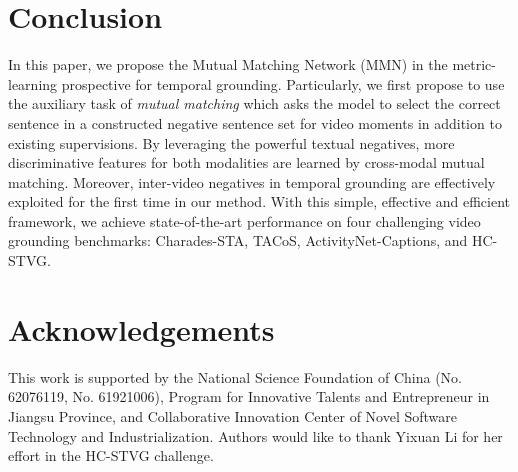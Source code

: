\documentclass[letterpaper]{article} \usepackage{aaai22}  \usepackage{times}  \usepackage{helvet}  \usepackage{courier}  \usepackage[hyphens]{url}  \usepackage{graphicx} \urlstyle{rm} \def\UrlFont{\rm}  \usepackage{natbib}  \usepackage{caption} \DeclareCaptionStyle{ruled}{labelfont=normalfont,labelsep=colon,strut=off} \frenchspacing  \setlength{\pdfpagewidth}{8.5in}  \setlength{\pdfpageheight}{11in}  \usepackage{algorithm}
\begin{document}
\section{Conclusion}
In this paper, we propose the Mutual Matching Network (MMN) in the metric-learning prospective for temporal grounding. Particularly, we first propose to use the auxiliary task of {\em mutual matching} which asks the model to select the correct sentence in a constructed negative sentence set for video moments in addition to existing supervisions. By leveraging the powerful textual negatives, more discriminative features for both modalities are learned by cross-modal mutual matching. Moreover, inter-video negatives in temporal grounding are effectively exploited for the first time in our method. With this simple, effective and efficient framework, we achieve state-of-the-art performance on four challenging video grounding benchmarks: Charades-STA, TACoS, ActivityNet-Captions, and HC-STVG.

\section*{Acknowledgements} 
This work is supported by the National Science Foundation of China (No. 62076119, No. 61921006), Program for Innovative Talents and Entrepreneur in Jiangsu Province, and Collaborative Innovation Center of Novel Software Technology and Industrialization. Authors would like to thank Yixuan Li for her effort in the HC-STVG challenge.
\clearpage


\end{document}
